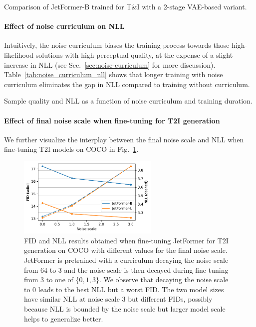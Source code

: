 \documentclass{article} %
\begin{document}
\begin{table}[h!]
    \caption{Comparison of JetFormer-B trained for T\&I with a 2-stage VAE-based variant.}
    \centering
    
    \label{tab:vae_ablation}
\end{table}

\paragraph{Effect of noise curriculum on NLL} Intuitively, the noise curriculum biases the training process towards those high-likelihood solutions with high perceptual quality, at the expense of a slight increase in NLL (see Sec.~\ref{sec:noise-curriculum} for more discussion). Table~\ref{tab:noise_curriculum_nll} shows that longer training with noise curriculum eliminates the gap in NLL compared to training without curriculum.

\begin{table}[h!]
    \caption{Sample quality and NLL as a function of noise curriculum and training duration.}
    \centering
    
    \label{tab:noise_curriculum_nll}
\end{table}

\paragraph{Effect of final noise scale when fine-tuning for T2I generation} We further visualize the interplay between the final noise scale and NLL when fine-tuning T2I models on COCO in Fig.~\ref{fig:fid_nll_t2i_ft}. 
\label{app:nll-fid-tradeoff}

\begin{figure}[h]
    \centering
    \includegraphics[width=0.6\textwidth]{figures/nll_fid_tradeoff.pdf}
    \caption{FID and NLL results obtained when fine-tuning JetFormer for T2I generation on COCO with different values for the final noise scale. JetFormer is pretrained with a curriculum decaying the noise scale from 64 to 3 and the noise scale is then decayed during fine-tuning from 3 to one of $\{0, 1, 3\}$. We observe that decaying the noise scale to 0 leads to the best NLL but a worst FID. The two model sizes have similar NLL at noise scale 3 but different FIDs, possibly because NLL is bounded by the noise scale but larger model scale helps to generalize better. \label{fig:fid_nll_t2i_ft}
    }
\end{figure}
\end{document}
